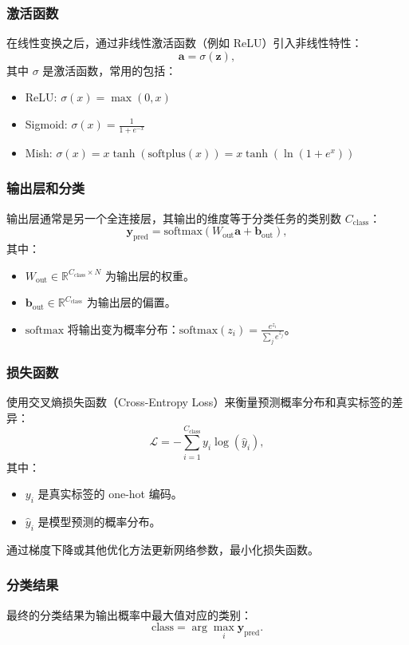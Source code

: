 \documentclass[12pt, a4paper, oneside]{ctexart}
\numberwithin{equation}{section}  %
\def\bd{\boldsymbol}        %
\def\add{\vspace{1ex}}      %
\begin{document}
\subsubsection{激活函数}
在线性变换之后，通过非线性激活函数（例如 ReLU）引入非线性特性：
\[
\bd{a} = \sigma(\bd{z}),
\]
其中 $\sigma$ 是激活函数，常用的包括：
\begin{itemize}
    \item ReLU: $\sigma(x) = \max(0, x)$\add
    \item Sigmoid: $\sigma(x) = \frac{1}{1 + e^{-x}}$\add
    \item Mish: $\sigma(x) = x\tanh(\text{softplus}(x))=x\tanh(\ln(1+e^x))$
\end{itemize}

\subsubsection{输出层和分类}
输出层通常是另一个全连接层，其输出的维度等于分类任务的类别数 $C_{\text{class}}$：
\[
\bd{y}_{\text{pred}} = \text{softmax}(W_{\text{out}} \bd{a} + \bd{b}_{\text{out}}),
\]
其中：
\begin{itemize}
    \item $W_{\text{out}} \in \mathbb{R}^{C_{\text{class}} \times N}$ 为输出层的权重。
    \item $\bd{b}_{\text{out}} \in \mathbb{R}^{C_{\text{class}}}$ 为输出层的偏置。
    \item $\text{softmax}$ 将输出变为概率分布：$\text{softmax}(z_i) = \frac{e^{z_i}}{\sum_{j} e^{z_j}}$。
\end{itemize}

\subsubsection{损失函数}
使用交叉熵损失函数（Cross-Entropy Loss）来衡量预测概率分布和真实标签的差异：
\[
\mathcal{L} = -\sum_{i=1}^{C_{\text{class}}} y_i \log(\hat{y}_i),
\]
其中：
\begin{itemize}
    \item $y_i$ 是真实标签的 one-hot 编码。
    \item $\hat{y}_i$ 是模型预测的概率分布。
\end{itemize}
通过梯度下降或其他优化方法更新网络参数，最小化损失函数。

\subsubsection{分类结果}
最终的分类结果为输出概率中最大值对应的类别：
\[
\text{class} = \arg\max_{i} \bd{y}_{\text{pred}}.
\]
\end{document}
